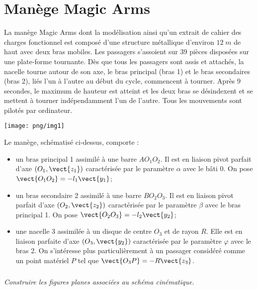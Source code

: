 \documentclass[10pt,oneside]{article}
\begin{document}
\section*{Manège Magic Arms } 
\setcounter{subparagraph}{0}

La manège Magic Arms dont la modélisation ainsi qu'un extrait de cahier des charges fonctionnel est composé d'une structure métallique d'environ $12\; m$ de haut avec deux bras mobiles. Les passagers s'assoient sur 39 pièces disposées sur une plate-forme tournante. Dès que tous les passagers sont assis et attachés, la nacelle tourne autour de son axe, le bras principal (bras 1) et le bras secondaires (bras 2), liés l'un à l'autre au début du cycle, commencent à tourner. Après 9 secondes, le maximum de hauteur est atteint et les deux bras se désindexent et se mettent à tourner indépendamment l'un de l'autre. Tous les mouvements sont pilotés par ordinateur. 

\begin{center}
\texttt{[image: png/img1]}
\end{center}

Le manège, schématisé ci-dessus, comporte :
\begin{itemize}
\item un bras principal 1 assimilé à une barre $AO_1O_2$. Il est en liaison pivot parfait d'axe $(O_1,\vect{z_1})$ caractérisée par le paramètre $\alpha$ avec le bâti 0. On pose $\vect{O_1O_2}=-l_1\vect{y_1}$;
\item un bras secondaire 2 assimilé à une barre $BO_2O_3$. Il est en liaison pivot parfait d'axe $(O_2,\vect{z_2})$ caractérisée par le paramètre $\beta$ avec le bras principal 1. On pose $\vect{O_2O_3}=-l_2\vect{y_2}$;
\item une nacelle 3 assimilée à un disque de centre $O_3$ et de rayon $R$. Elle est en liaison parfaite d'axe $(O_3,\vect{y_2})$ caractérisée par le paramètre $\varphi$ avec le bras 2. On s'intéresse plus particulièrement à un passager considéré comme un point matériel $P$ tel que $\vect{O_3P}=-R\vect{z_3}$.
\end{itemize}
\subparagraph{}
\textit{Construire les figures planes associées au schéma cinématique.}
\end{document}
